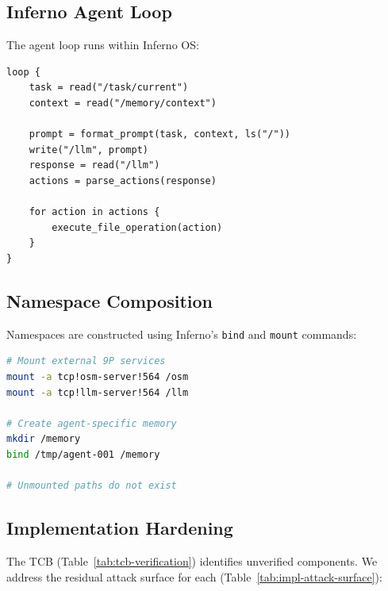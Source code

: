 \documentclass[acmsmall,screen,review]{acmart}
\begin{document}
\subsection{Inferno Agent Loop}

The agent loop runs within Inferno OS:

\begin{lstlisting}[caption={Agent loop pseudocode}]
loop {
    task = read("/task/current")
    context = read("/memory/context")

    prompt = format_prompt(task, context, ls("/"))
    write("/llm", prompt)
    response = read("/llm")
    actions = parse_actions(response)

    for action in actions {
        execute_file_operation(action)
    }
}
\end{lstlisting}

\subsection{Namespace Composition}

Namespaces are constructed using Inferno's \texttt{bind} and \texttt{mount} commands:

\begin{lstlisting}[language=bash,caption={Namespace construction}]
# Mount external 9P services
mount -a tcp!osm-server!564 /osm
mount -a tcp!llm-server!564 /llm

# Create agent-specific memory
mkdir /memory
bind /tmp/agent-001 /memory

# Unmounted paths do not exist
\end{lstlisting}

\subsection{Implementation Hardening}
\label{sec:impl-hardening}

The TCB (Table~\ref{tab:tcb-verification}) identifies unverified components. We address the residual attack surface for each (Table~\ref{tab:impl-attack-surface}):
\end{document}

